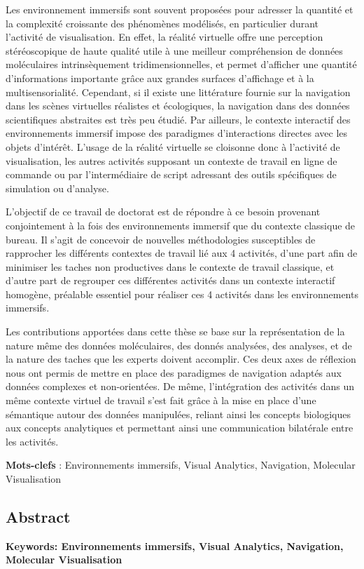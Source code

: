 Les environnement immersifs sont souvent proposées pour adresser la quantité et la complexité croissante des phénomènes modélisés, en particulier durant l'activité de visualisation. En effet, la réalité virtuelle offre une perception stéréoscopique de haute qualité utile à une meilleur compréhension de données moléculaires intrinsèquement tridimensionnelles, et permet d'afficher une quantité d'informations importante grâce aux grandes surfaces d'affichage et à la multisensorialité. Cependant, si il existe une littérature fournie sur la navigation dans les scènes virtuelles réalistes et écologiques, la navigation dans des données scientifiques abstraites est très peu étudié. Par ailleurs, le contexte interactif des environnements immersif impose des paradigmes d'interactions directes avec les objets d'intérêt. L'usage de la réalité virtuelle se cloisonne donc à l'activité de visualisation, les autres activités supposant un contexte de travail en ligne de commande ou par l'intermédiaire de script adressant des outils spécifiques de simulation ou d'analyse.

L'objectif de ce travail de doctorat est de répondre à ce besoin provenant conjointement à la fois des environnements immersif que du contexte classique de bureau. Il s'agit de concevoir de nouvelles méthodologies susceptibles de rapprocher les différents contextes de travail lié aux 4 activités, d'une part afin de minimiser les taches non productives dans le contexte de travail classique, et d'autre part de regrouper ces différentes activités dans un contexte interactif homogène, préalable essentiel pour réaliser ces 4 activités dans les environnements immersifs.

Les contributions apportées dans cette thèse se base sur la représentation de la nature même des données moléculaires, des donnés analysées, des analyses, et de la nature des taches que les experts doivent accomplir. Ces deux axes de réflexion nous ont permis de mettre en place des paradigmes de navigation adaptés aux données complexes et non-orientées. De même, l'intégration des activités dans un même contexte virtuel de travail s'est fait grâce à la mise en place d'une sémantique autour des données manipulées, reliant ainsi les concepts biologiques aux concepts analytiques et permettant ainsi une communication bilatérale entre les activités.

\textbf{Mots-clefs} : Environnements immersifs, Visual Analytics, Navigation, Molecular Visualisation


\begin{otherlanguage}{english}

%
  
\subsection*{Abstract}
  
\footnotesize

\textbf{Keywords: Environnements immersifs, Visual Analytics, Navigation, Molecular Visualisation} 

\end{otherlanguage} 